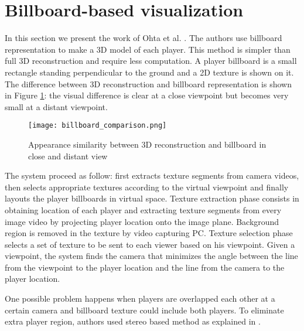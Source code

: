 \section{Billboard-based visualization}
In this section we present the work of Ohta et al. \cite{03_billboard}.
The authors use billboard representation to make a 3D model of each player.
This method is simpler than full 3D reconstruction and require less computation.
A player billboard is a small rectangle standing perpendicular to the ground
and a 2D texture is shown on it.
The difference between 3D reconstruction and billboard representation is shown in Figure \ref{fig:billboard_comparison}:
the visual difference is clear at a close viewpoint but becomes very small at a distant viewpoint.

\begin{figure}[htbp]
\centerline{\texttt{[image: billboard\_comparison.png]}}
\caption{Appearance similarity between 3D reconstruction and billboard in close and distant view \cite{03_billboard}}
\label{fig:billboard_comparison}
\end{figure}


The system proceed as follow: first extracts texture segments from camera videos, then selects appropriate textures according
to the virtual viewpoint and finally layouts the player billboards in virtual space.
Texture extraction phase consists in obtaining location of each player and extracting texture segments from every image 
video by projecting player location onto the image plane.
Background region is removed in the texture by video capturing PC.
Texture selection phase selects a set of texture to be sent to each viewer based on his viewpoint. 
Given a viewpoint, the system finds the camera that minimizes the angle between the line from the viewpoint to the player 
location and the line from the camera to the player location.

One possible problem happens when players are overlapped each other at a certain camera and billboard texture could include both
players.
To eliminate extra player region, authors used stereo based method \cite{billboard:4_TODO} as explained in \cite{03_billboard}. 

